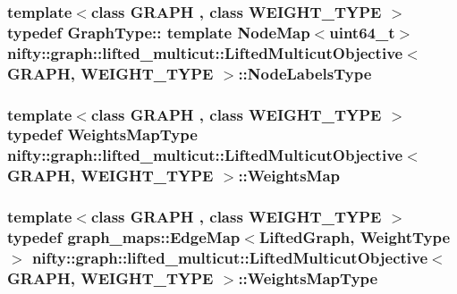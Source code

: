 \subsubsection[{Node\+Labels\+Type}]{\setlength{\rightskip}{0pt plus 5cm}template$<$class G\+R\+A\+P\+H , class W\+E\+I\+G\+H\+T\+\_\+\+T\+Y\+P\+E $>$ typedef Graph\+Type\+:: template Node\+Map$<$uint64\+\_\+t$>$ {\bf nifty\+::graph\+::lifted\+\_\+multicut\+::\+Lifted\+Multicut\+Objective}$<$ G\+R\+A\+P\+H, W\+E\+I\+G\+H\+T\+\_\+\+T\+Y\+P\+E $>$\+::{\bf Node\+Labels\+Type}}\label{classnifty_1_1graph_1_1lifted__multicut_1_1LiftedMulticutObjective_acb83822c1988d6ea4b3390a508974a92}
\hypertarget{classnifty_1_1graph_1_1lifted__multicut_1_1LiftedMulticutObjective_a2063225a63332d8a74f82fef80f09d0b}{}
\subsubsection[{Weights\+Map}]{\setlength{\rightskip}{0pt plus 5cm}template$<$class G\+R\+A\+P\+H , class W\+E\+I\+G\+H\+T\+\_\+\+T\+Y\+P\+E $>$ typedef {\bf Weights\+Map\+Type} {\bf nifty\+::graph\+::lifted\+\_\+multicut\+::\+Lifted\+Multicut\+Objective}$<$ G\+R\+A\+P\+H, W\+E\+I\+G\+H\+T\+\_\+\+T\+Y\+P\+E $>$\+::{\bf Weights\+Map}}\label{classnifty_1_1graph_1_1lifted__multicut_1_1LiftedMulticutObjective_a2063225a63332d8a74f82fef80f09d0b}
\hypertarget{classnifty_1_1graph_1_1lifted__multicut_1_1LiftedMulticutObjective_a1bedc00e04e909f65ce2017855a317ac}{}
\subsubsection[{Weights\+Map\+Type}]{\setlength{\rightskip}{0pt plus 5cm}template$<$class G\+R\+A\+P\+H , class W\+E\+I\+G\+H\+T\+\_\+\+T\+Y\+P\+E $>$ typedef {\bf graph\+\_\+maps\+::\+Edge\+Map}$<${\bf Lifted\+Graph}, {\bf Weight\+Type}$>$ {\bf nifty\+::graph\+::lifted\+\_\+multicut\+::\+Lifted\+Multicut\+Objective}$<$ G\+R\+A\+P\+H, W\+E\+I\+G\+H\+T\+\_\+\+T\+Y\+P\+E $>$\+::{\bf Weights\+Map\+Type}}\label{classnifty_1_1graph_1_1lifted__multicut_1_1LiftedMulticutObjective_a1bedc00e04e909f65ce2017855a317ac}
\hypertarget{classnifty_1_1graph_1_1lifted__multicut_1_1LiftedMulticutObjective_abed7e2553691af6e16c0b400dcc05c63}{}
